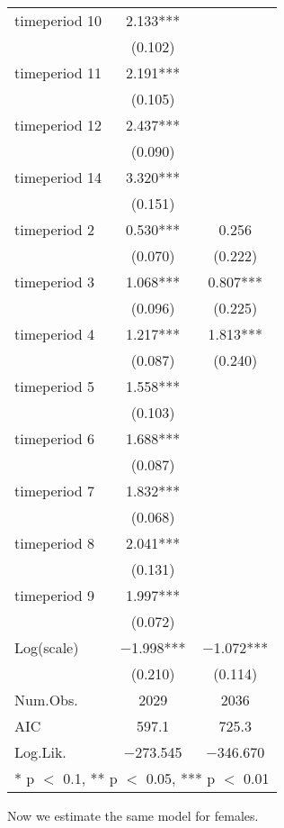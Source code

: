 \documentclass[
]{article}
\begin{document}
\begin{table}[!h]
\begin{tabular}[t]{lcc}
timeperiod 10 & \num{2.133}*** & \\
 & (\num{0.102}) & \\
timeperiod 11 & \num{2.191}*** & \\
 & (\num{0.105}) & \\
timeperiod 12 & \num{2.437}*** & \\
 & (\num{0.090}) & \\
timeperiod 14 & \num{3.320}*** & \\
 & (\num{0.151}) & \\
timeperiod 2 & \num{0.530}*** & \num{0.256}\\
 & (\num{0.070}) & (\num{0.222})\\
timeperiod 3 & \num{1.068}*** & \num{0.807}***\\
 & (\num{0.096}) & (\num{0.225})\\
timeperiod 4 & \num{1.217}*** & \num{1.813}***\\
 & (\num{0.087}) & (\num{0.240})\\
timeperiod 5 & \num{1.558}*** & \\
 & (\num{0.103}) & \\
timeperiod 6 & \num{1.688}*** & \\
 & (\num{0.087}) & \\
timeperiod 7 & \num{1.832}*** & \\
 & (\num{0.068}) & \\
timeperiod 8 & \num{2.041}*** & \\
 & (\num{0.131}) & \\
timeperiod 9 & \num{1.997}*** & \\
 & (\num{0.072}) & \\
Log(scale) & \num{-1.998}*** & \num{-1.072}***\\
 & (\num{0.210}) & (\num{0.114})\\
\midrule
Num.Obs. & \num{2029} & \num{2036}\\
AIC & \num{597.1} & \num{725.3}\\
Log.Lik. & \num{-273.545} & \num{-346.670}\\
\bottomrule
\multicolumn{3}{l}{\rule{0pt}{1em}* p $<$ 0.1, ** p $<$ 0.05, *** p $<$ 0.01}\\
\end{tabular}
\end{table}

\clearpage

Now we estimate the same model for females.
\end{document}
